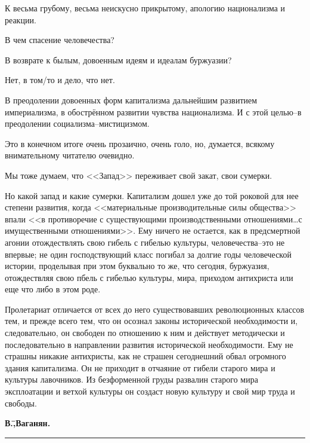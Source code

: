 К весьма грубому, весьма неискусно прикрытому, апологию национализма и реакции.

В чем спасение человечества?

В возврате к былым, довоенным идеям и идеалам буржуазии?

Нет, в том\-/то и дело, что нет.

В преодолении довоенных форм капитализма дальнейшим развитием империализма, в обострённом развитии чувства национализма. И с этой целью\---в преодолении социализма\---мистицизмом.

Это в конечном итоге очень прозаично, очень голо, но, думается, всякому внимательному читателю очевидно.

Мы тоже думаем, что <<Запад>> переживает свой закат, свои сумерки.

Но какой запад и какие сумерки. Капитализм дошел уже до той роковой для нее степени развития, когда <<материальные производительные силы общества>> впали <<в противоречие с существующими производственными отношениями\dots с имущественными отношениями>>. Ему ничего не остается, как в предсмертной агонии отождествлять свою гибель с гибелью культуры, человечества\---это не впервые; не один господствующий класс погибал за долгие годы человеческой истории, проделывая при этом буквально то же, что сегодня, буржуазия, отождествляя свою пбель с гибелью культуры, мира, приходом антихриста или еще что либо в этом роде.

Пролетариат отличается от всех до него существовавших революционных классов тем, и прежде всего тем, что он осознал законы исторической необходимости и, следовательно, он свободен по отношению к ним и действует методически и последовательно в направлении развития исторической необходимости. Ему не страшны никакие антихристы, как не страшен сегоднешний обвал огромного здания капитализма. Он не приходит в отчаяние от гибели старого мира и культуры лавочников. Из безформенной груды развалин старого мира эксплоатации и ветхой культуры он создаст новую культуру и свой мир труда и свободы.

\begin{flushright}
 \textbf{В.\=,Ваганян.}\hspace*{2em}
\end{flushright}
\begin{center}
 \vspace{2em}
 \rule{7em}{1pt}
 \vspace{2em}
\end{center}
